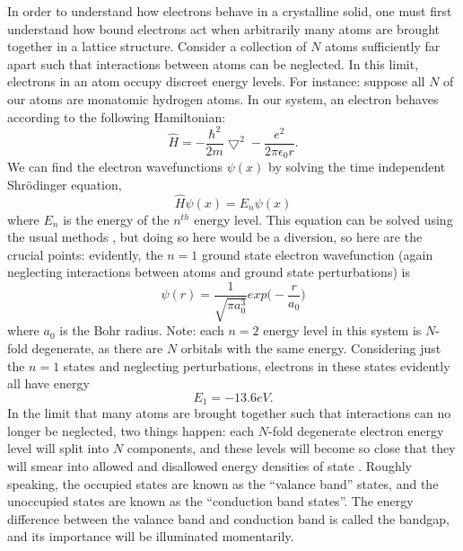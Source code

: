 \indent In order to understand how electrons behave in a crystalline solid, one must first understand how bound electrons act when arbitrarily many atoms are brought together in a lattice structure. Consider a collection of $N$ atoms sufficiently far apart such that interactions between atoms can be neglected. In this limit, electrons in an atom occupy discreet energy levels. For instance: suppose all $N$ of our atoms are monatomic hydrogen atoms. In our system, an electron behaves according to the following Hamiltonian:
\begin{equation}
\hat{H} = -\frac{\hbar^2}{2m} \bigtriangledown^2 - \frac{e^2}{2\pi \epsilon_0 r}.
\end{equation}
We can find the electron wavefunctions $\psi(x)$ by solving the time independent Shr\"{o}dinger equation,
\begin{equation}
\hat{H}\psi(x) = E_n\psi(x)
\end{equation}
where $E_n$ is the energy of the $n^{th}$ energy level. This equation can be solved using the usual methods \cite{griffiths}, but doing so here would be a diversion, so here are the crucial points: evidently, the $n=1$ ground state electron wavefunction (again neglecting interactions between atoms and ground state perturbations) is
\begin{equation}
\psi(r) = \frac{1}{\sqrt{\pi a_{0}^{3}}}exp\big (-\frac{r}{a_{0}}\big)
\end{equation}
where $a_0$ is the Bohr radius. Note: each $n = 2$ energy level in this system is $N$-fold degenerate, as there are $N$ orbitals with the same energy. Considering just the $n = 1$ states and neglecting perturbations, electrons in these states evidently all have energy
\begin{equation}
E_1 = -13.6eV.
\end{equation}
In the limit that many atoms are brought together such that interactions can no longer be neglected, two things happen: each $N$-fold degenerate electron energy level will split into $N$ components, and these levels will become so close that they will smear into allowed and disallowed energy densities of state \cite{iadonisi, sirdesh, griffiths, davies, fox}. Roughly speaking, the occupied states are known as the ``valance band'' states, and the unoccupied states are known as the ``conduction band states''. The energy difference between the valance band and conduction band is called the bandgap, and its importance will be illuminated momentarily. 

